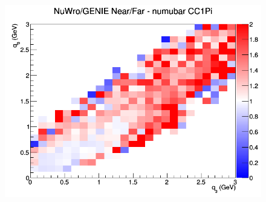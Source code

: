 \begin{figure}[h]
\endminipage
{}
\includegraphics[width=\linewidth]{eff_q0_q3/LAr/ratios/CC1Pi_NuWro_GENIE_numubar_NF_q3_q0.png}
\endminipage
\newline
\end{figure}
\clearpage
